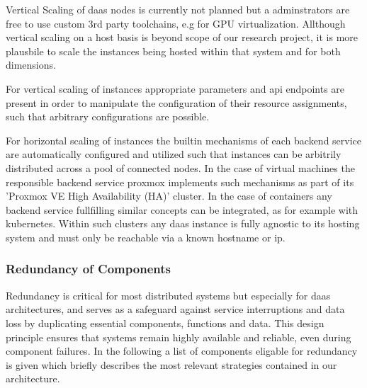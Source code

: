 \documentclass[runningheads]{llncs}
\begin{document}
Vertical Scaling of daas nodes is currently not planned
but a adminstrators are free to use custom 3rd party toolchains, e.g for GPU virtualization.
Allthough vertical scaling on a host basis
is beyond scope of our research project,
it is more plausbile to scale the instances
being hosted within that system and for both dimensions.

For vertical scaling of instances appropriate parameters and api endpoints are present
in order to manipulate the configuration of their resource assignments,
such that arbitrary configurations are possible.

For horizontal scaling of instances
the builtin mechanisms of each backend service are automatically configured and utilized
such that instances can be arbitrily distributed across a pool of connected nodes.
In the case of virtual machines the responsible backend service proxmox implements
such mechanisms as part of its 'Proxmox VE High Availability (HA)' cluster.
In the case of containers any backend service fullfilling
similar concepts can be integrated, as for example with kubernetes.
Within such clusters any daas instance is fully agnostic to its hosting system
and must only be reachable via a known hostname or ip.

\subsubsection{Redundancy of Components}

Redundancy is critical for most distributed systems
but especially for daas architectures,
and serves as a safeguard against service interruptions and data loss
by duplicating essential components, functions and data.
This design principle ensures that systems remain highly available and reliable,
even during component failures.
In the following a list of components eligable for redundancy is given
which briefly describes the most relevant strategies contained in our architecture.
\end{document}

